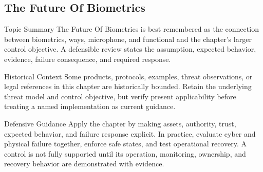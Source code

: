 \documentclass[11pt,letterpaper]{article}
\begin{document}
\subsection*{The Future Of Biometrics}
\begin{CornellNotesTable}
\end{CornellNotesTable}
\begin{CornellSummaryBox}{Topic Summary}
The Future Of Biometrics is best remembered as the connection between biometrics, ways, microphone, and functional and the chapter's larger control objective. A defensible review states the assumption, expected behavior, evidence, failure consequence, and required response.
\end{CornellSummaryBox}
\begin{CornellWarningBox}{Historical Context}
Some products, protocols, examples, threat observations, or legal references in this chapter are historically bounded. Retain the underlying threat model and control objective, but verify present applicability before treating a named implementation as current guidance.
\end{CornellWarningBox}
\begin{CornellOverviewBox}{Defensive Guidance}
Apply the chapter by making assets, authority, trust, expected behavior, and failure response explicit. In practice, evaluate cyber and physical failure together, enforce safe states, and test operational recovery. A control is not fully supported until its operation, monitoring, ownership, and recovery behavior are demonstrated with evidence.
\end{CornellOverviewBox}
\end{document}
